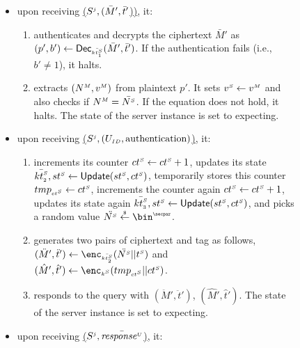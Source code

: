 \begin{figure}[H]
\begin{center}
\begin{tcolorbox}[enhanced,width=3.3in, left=0.1cm,
    drop fuzzy shadow southwest,
    colframe=black,colback=white]
{{\begin{itemize}[leftmargin=.4cm]
\begin{enumerate}
 \item responds to the query with $(\bar M,\bar t)$. The state of the server instance is set to ``expecting''.
 \end{enumerate}
 \item upon receiving  \underline{\send($S^{\scriptscriptstyle j}, (\bar M',  \bar t'$))}, it:
 \begin{enumerate}
 \item authenticates and decrypts the ciphertext $\bar M'$ as $(p', b') \gets \mathsf{Dec}_{\scriptscriptstyle\bar{{kt}^{\scriptscriptstyle S}_{\scriptscriptstyle 1}}}(\bar M', \bar t')$. If the authentication fails (i.e., $b'\neq 1$), it halts. 
\item    extracts $({N}^{\scriptscriptstyle M}, {v}^{\scriptscriptstyle M})$ from plaintext $p'$. It sets ${v}^{\scriptscriptstyle S}\gets{v}^{\scriptscriptstyle M}$ and also  checks if ${N}^{\scriptscriptstyle M}=\bar{{N}^{\scriptscriptstyle S}}$. If the equation does not hold, it halts. The state of the server instance is set to expecting.
 \end{enumerate}
 \item upon receiving  \underline{\send($S^{\scriptscriptstyle j}, (U_{\scriptscriptstyle ID},  \text{authentication})$)}, it:
 \begin{enumerate}
  \item  increments its counter  ${ct}^{\scriptscriptstyle S} \gets {ct}^{\scriptscriptstyle S} + 1$, updates its state  $\bar{{kt}^{\scriptscriptstyle S}_{\scriptscriptstyle 2}}, {st}^{\scriptscriptstyle S} \gets \mathsf{Update}({st}^{\scriptscriptstyle S}, {ct}^{\scriptscriptstyle S})$,  temporarily stores this counter ${tmp}_{\scriptscriptstyle{ct}^{\scriptscriptstyle S}} \gets {ct}^{\scriptscriptstyle S}$, increments the counter again ${ct}^{\scriptscriptstyle S} \gets {ct}^{\scriptscriptstyle S} + 1$, updates its state again $\bar{{kt}^{\scriptscriptstyle S}_{\scriptscriptstyle 3}}, {st}^{\scriptscriptstyle S} \gets \mathsf{Update}({st}^{\scriptscriptstyle S}, {ct}^{\scriptscriptstyle S})$, and picks a random value $\ddot{\VS{\nonce}} \stackrel{\sss\$}\leftarrow \bin^{\sss\secpar}$.
  \item generates two pairs of ciphertext and tag as follows, $(\ddot M', \ddot t')\leftarrow \enc_{\sss\bar{\VS{\keyt_{\sss 2}}}}(\ddot{\VS{\nonce}} || \VS{\trans})$ and  $(\hat M', \hat t')\leftarrow \enc_{\sss\VS{k}}(\tmp_{\sss\VS{\counter}} || \VS{\counter})$. 
  \item responds to the query with $(\ddot M', \ddot t')$, $(\hat M', \hat t')$. The state of the server instance is set to expecting.
 \end{enumerate}
 \item upon receiving  \underline{\send($S^{\scriptscriptstyle j},   \bar{\mathit{response}^{\scriptscriptstyle U}}$)}, it:
 \begin{enumerate}

\end{enumerate}
\end{itemize}}}
\end{tcolorbox}
\end{center}
\end{figure}
